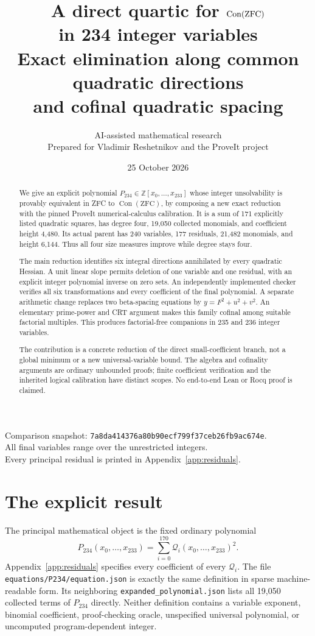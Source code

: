\documentclass[10pt,letterpaper]{article}
\title{\textbf{A direct quartic for $\Con(\mathrm{ZFC})$\\in 234 integer variables}\\[0.5em]
\large Exact elimination along common quadratic directions\\and cofinal quadratic spacing}
\author{AI-assisted mathematical research\\Prepared for Vladimir Reshetnikov and the ProveIt project}
\date{25 October 2026}
\theoremstyle{definition}\newtheorem{remark}[theorem]{Remark}
\newcommand{\Z}{\mathbb Z}\newcommand{\Q}{\mathbb Q}\newcommand{\N}{\mathbb N}
\newcommand{\Con}{\operatorname{Con}}
\newcommand{\New}{P_{\mathrm{234}}}
\begin{document}
\maketitle\thispagestyle{empty}
\begin{abstract}
We give an explicit polynomial $\New\in\Z[x_0,\ldots,x_{233}]$ whose
integer unsolvability is provably equivalent in ZFC to $\Con(\mathrm{ZFC})$,
by composing a new exact reduction with the pinned ProveIt numerical-calculus
calibration. It is a sum of 171 explicitly listed quadratic squares, has
degree four, 19,050 collected monomials, and coefficient height 4,480.
Its actual parent has 240 variables, 177 residuals, 21,482 monomials, and
height 6,144. Thus all four size measures improve while degree stays four.

The main reduction identifies six integral directions annihilated by every
quadratic Hessian. A unit linear slope permits deletion of one variable and
one residual, with an explicit integer polynomial inverse on zero sets.
An independently implemented checker verifies all six transformations and
every coefficient of the final polynomial. A separate arithmetic change
replaces two beta-spacing equations by $y=F^2+u^2+v^2$. An elementary
prime-power and CRT argument makes this family cofinal among suitable
factorial multiples. This produces factorial-free companions in 235 and
236 integer variables.

The contribution is a concrete reduction of the direct small-coefficient
branch, not a global minimum or a new universal-variable bound. The algebra
and cofinality arguments are ordinary unbounded proofs; finite coefficient
verification and the inherited logical calibration have distinct scopes.
No end-to-end Lean or Rocq proof is claimed.
\end{abstract}
\vfill
\begin{center}\small
Comparison snapshot: \texttt{7a8da414376a80b90ecf799f37ceb26fb9ac674e}.\\
All final variables range over the unrestricted integers.\\
Every principal residual is printed in Appendix~\ref{app:residuals}.
\end{center}
\newpage\tableofcontents\newpage

\section{The explicit result}

The principal mathematical object is the fixed ordinary polynomial
\begin{equation}\label{eq:main}
 \boxed{\qquad \New(x_0,\ldots,x_{233})=
            \sum_{i=0}^{170}\mathcal Q_i(x_0,\ldots,x_{233})^2.\qquad}
\end{equation}
Appendix~\ref{app:residuals} specifies every coefficient of every
$\mathcal Q_i$. The file \nolinkurl{equations/P234/equation.json} is exactly
the same definition in sparse machine-readable form. Its neighboring
\nolinkurl{expanded_polynomial.json} lists all 19,050 collected terms of
$\New$ directly. Neither definition contains a variable exponent, binomial
coefficient, proof-checking oracle, unspecified universal polynomial, or
uncomputed program-dependent integer.
\end{document}

